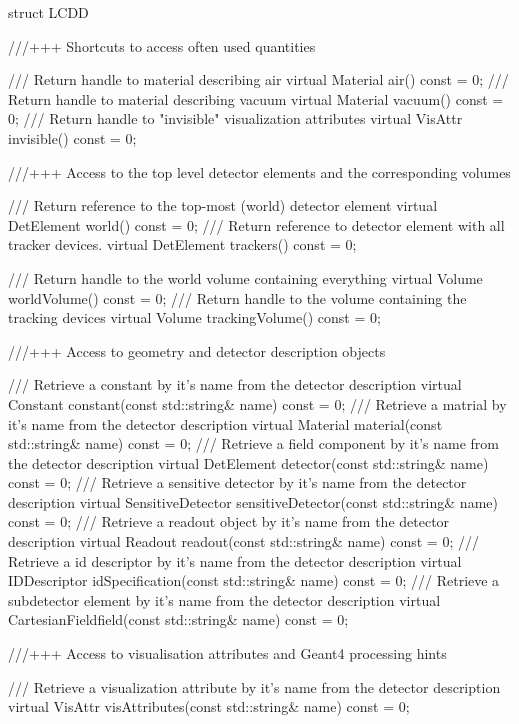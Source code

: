 \documentclass[10pt,a4paper]{article}
\begin{document}
\begin{code}
struct LCDD {

  ///+++ Shortcuts to access often used quantities

  /// Return handle to material describing air
  virtual Material air() const = 0;
  /// Return handle to material describing vacuum
  virtual Material vacuum() const = 0;
  /// Return handle to "invisible" visualization attributes
  virtual VisAttr  invisible() const = 0;

  ///+++ Access to the top level detector elements and the corresponding volumes

  /// Return reference to the top-most (world) detector element
  virtual DetElement    world() const = 0;
  /// Return reference to detector element with all tracker devices.
  virtual DetElement    trackers() const = 0;

  /// Return handle to the world volume containing everything
  virtual Volume        worldVolume() const = 0;
  /// Return handle to the volume containing the tracking devices
  virtual Volume        trackingVolume() const = 0;

  ///+++ Access to geometry and detector description objects

  /// Retrieve a constant by it's name from the detector description
  virtual Constant      constant(const std::string& name)      const = 0;
  /// Retrieve a matrial by it's name from the detector description
  virtual Material      material(const std::string& name)      const = 0;
  /// Retrieve a field component by it's name from the detector description
  virtual DetElement    detector(const std::string& name)      const = 0;
  /// Retrieve a sensitive detector by it's name from the detector description
  virtual SensitiveDetector sensitiveDetector(const std::string& name) const = 0;
  /// Retrieve a readout object by it's name from the detector description
  virtual Readout       readout(const std::string& name)       const = 0;
  /// Retrieve a id descriptor by it's name from the detector description
  virtual IDDescriptor  idSpecification(const std::string& name)   const = 0;
  /// Retrieve a subdetector element by it's name from the detector description
  virtual CartesianFieldfield(const std::string& name)     const = 0;

  ///+++ Access to visualisation attributes and Geant4 processing hints

  /// Retrieve a visualization attribute by it's name from the detector description
  virtual VisAttr       visAttributes(const std::string& name) const = 0;

}
\end{code}
\end{document}
